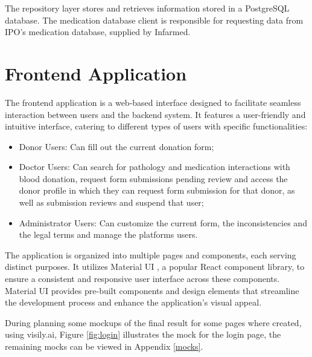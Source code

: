 The repository layer stores and retrieves information stored in a PostgreSQL database.
The medication database client is responsible for requesting data from IPO's medication database, supplied by Infarmed.






\section{Frontend Application}\label{architecture_frontend}

The frontend application is a web-based interface designed to facilitate seamless interaction between users and the backend system. It features a user-friendly and intuitive interface, catering to different types of users with specific functionalities:

\begin{itemize}
	\item Donor Users: Can fill out the current donation form;
	\item Doctor Users: Can search for pathology and medication interactions with blood donation, request form submissions pending review and access the donor profile in which they can request form submission for that donor, as well as submission reviews and suspend that user;
	\item Administrator Users: Can customize the current form, the inconsistencies and the legal terms and manage the platforms users.
\end{itemize}

The application is organized into multiple pages and components, each serving distinct purposes. It utilizes Material UI \cite{Material_UI}, a popular React component library, to ensure a consistent and responsive user interface across these components. Material UI provides pre-built components and design elements that streamline the development process and enhance the application's visual appeal.

During planning some mockups of the final result for some pages where created, using visily.ai\cite{Visily}, Figure \ref{fig:login} illustrates the mock for the login page, the remaining mocks can be viewed in Appendix \ref{mocks}.

